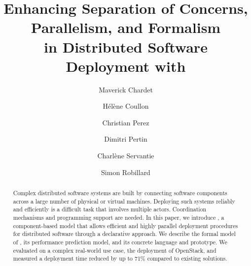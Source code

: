 \documentclass[5p]{elsarticle}
\begin{document}
\begin{frontmatter}

  \title{Enhancing Separation of Concerns, Parallelism, and
  Formalism\\ in Distributed Software Deployment with \mad}

  \author[label1]{Maverick Chardet}
  \author[label1]{Hélène Coullon}
  \author[label2]{Christian Perez}
  \author[label1]{Dimitri Pertin}
  \author[label1]{Charlène Servantie}
  \author[label1]{Simon Robillard}

\address[label1]{IMT Atlantique, Inria, LS2N, UBL, F-44307 Nantes, France}
\address[label2]{Univ Lyon, Inria, EnsL, UCBL, CNRS, LIP, Lyon, France}


\begin{abstract}
Complex distributed software systems are built by connecting software
components across a large number of physical or virtual machines.
Deploying such systems reliably and efficiently is a difficult task
that involves multiple actors. Coordination mechanisms and programming
support are needed.
%
In this paper, we introduce \mad, a component-based model that allows efficient and
highly parallel deployment procedures for distributed software
through a declarative approach. We describe the formal model of \mad,
its performance prediction model, and its concrete language and
prototype. We evaluated \mad on a complex real-world use case, the
deployment of OpenStack, and measured a deployment time reduced by up
to 71\% compared to existing solutions.


\end{abstract}
\end{frontmatter}
\end{document}
